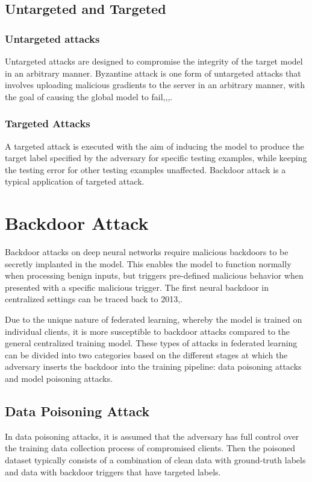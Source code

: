 \documentclass[conference]{IEEEtran}
\begin{document}
\subsection{Untargeted and Targeted}
\subsubsection{Untargeted attacks}Untargeted attacks are designed to compromise
the integrity of the target model in an arbitrary manner.
Byzantine attack is one form of untargeted attacks that involves
uploading malicious gradients to the server in an arbitrary manner,
with the goal of causing the global model to fail\cite{b48},\cite{b49},\cite{b50},\cite{b51}.
\subsubsection{Targeted Attacks}A targeted attack is executed with
the aim of inducing the model to produce the target label specified by the
adversary for specific testing examples, while keeping the testing error for
other testing examples unaffected\cite{b51}. Backdoor attack is a typical application of targeted attack.


\section{Backdoor Attack}
Backdoor attacks on deep neural networks require malicious backdoors to be secretly implanted in the model. 
This enables the model to function
normally when processing benign inputs, but triggers  pre-defined
malicious behavior when presented with a specific malicious trigger.
The first neural backdoor in centralized settings can be traced
back to 2013\cite{b52},\cite{b53}.

Due to the unique nature of federated learning, whereby the model is trained
on individual clients, it is more susceptible to backdoor attacks compared
to the general centralized training model. These types of attacks in federated
learning can be divided into two categories based on the different stages at
which the adversary inserts the backdoor into the training pipeline: data
poisoning attacks and model poisoning attacks.

\subsection{Data Poisoning Attack}
In data poisoning attacks, it is assumed that the adversary has full control
over the training data collection process of compromised clients. Then the poisoned
dataset typically consists of a combination of clean data with ground-truth labels
and data with backdoor triggers that have targeted labels.
\end{document}
